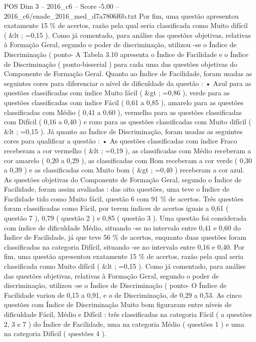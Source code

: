 \begin{textsample}{POS Dim 3 – 2016\_c6 – Score -5.00 – 2016\_c6/enade\_2016\_med\_d7a7806f6b.txt}
Por fim, uma questão apresentou exatamente 15 \% de acertos, razão pela qual seria classificada como Muito difícil ( \&lt ; =0,15 ).
Como já comentado, para análise das questões objetivas, relativas à Formação Geral, segundo o poder de discriminação, utilizou -se o Índice de Discriminação ( ponto- A Tabela 3.10 apresenta o Índice de Facilidade e o Índice de Discriminação ( ponto-bisserial ) para cada uma das questões objetivas do Componente de Formação Geral.
Quanto ao Índice de Facilidade, foram usadas as seguintes cores para diferenciar o nível de dificuldade da questão : • Azul para as questões classificadas com índice Muito fácil ( \&gt ; =0,86 ), verde para as questões classificadas com índice Fácil ( 0,61 a 0,85 ), amarelo para as questões classificadas com Médio ( 0,41 a 0,60 ), vermelho para as questões classificadas com Difícil ( 0,16 a 0,40 ) e roxo para as questões classificadas com Muito difícil ( \&lt ; =0,15 ).
Já quanto ao Índice de Discriminação, foram usadas as seguintes cores para qualificar a questão : • As questões classificadas com índice Fraco receberam a cor vermelho ( \&lt ; =0,19 ), as classificadas com Médio receberam a cor amarelo ( 0,20 a 0,29 ), as classificadas com Bom receberam a cor verde ( 0,30 a 0,39 ) e as classificadas com Muito bom ( \&gt ; =0,40 ) receberam a cor azul.
As questões objetivas do Componente de Formação Geral, segundo o Índice de Facilidade, foram assim avaliadas : das oito questões, uma teve o Índice de Facilidade tido como Muito fácil, questão 6 com 91 \% de acertos.
Três questões foram classificadas como Fácil, por terem índices de acertos iguais a 0,61 ( questão 7 ), 0,79 ( questão 2 ) e 0,85 ( questão 3 ).
Uma questão foi considerada com índice de dificuldade Médio, situando -se no intervalo entre 0,41 e 0,60 do Índice de Facilidade, já que teve 56 \% de acertos, enquanto duas questões foram classificadas na categoria Difícil, situando -se no intervalo entre 0,16 e 0,40.
Por fim, uma questão apresentou exatamente 15 \% de acertos, razão pela qual seria classificada como Muito difícil ( \&lt ; =0,15 ).
Como já comentado, para análise das questões objetivas, relativas à Formação Geral, segundo o poder de discriminação, utilizou -se o Índice de Discriminação ( ponto- O Índice de Facilidade variou de 0,15 a 0,91, e o de Discriminação, de 0,29 a 0,53.
As cinco questões com Índice de Discriminação Muito bom figuraram entre níveis de dificuldade Fácil, Médio e Difícil : três classificadas na categoria Fácil ( a questões 2, 3 e 7 ) do Índice de Facilidade, uma na categoria Médio ( questões 1 ) e uma na categoria Difícil ( questões 4 ).

\end{textsample}
